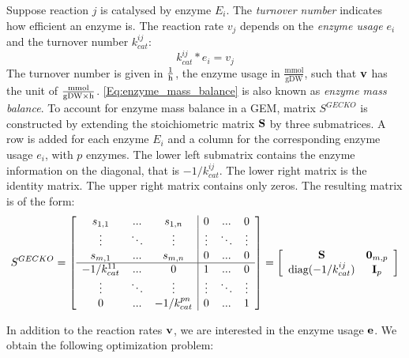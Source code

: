 Suppose reaction $j$ is catalysed by enzyme $E_i$. The \textit{turnover number} indicates how efficient an enzyme is. The reaction rate $v_j$ depends on the \textit{enzyme usage} $e_i$ and the turnover number $k_{cat}^{ij}$: 
\begin{equation} \label{Eq:enzyme_mass_balance}
    k_{cat}^{ij} * e_i = v_j   
\end{equation}
The turnover number is given in $\frac{1}{\text h}$, the enzyme usage in $\frac{\text{mmol}}{\text{gDW}}$, such that $\bold v$ has the unit of $\frac{\text{mmol}}{\text{gDW} \times \text h}$. 
\cref{Eq:enzyme_mass_balance} is also known as \textit{enzyme mass balance}.
To account for enzyme mass balance in a GEM, matrix $S^{GECKO}$ is constructed by extending the stoichiometric matrix $\bold S$ by three submatrices. 
A row is added for each enzyme $E_i$ and a column for the corresponding enzyme usage $e_i$, with $p$ enzymes. The lower left submatrix contains the enzyme information on the diagonal, that is $-1/k_{cat}^{ij}$. The lower right matrix is the identity matrix. The upper right matrix contains only zeros.
The resulting matrix is of the form:
\begin{equation*}
    S^{GECKO} = \left[\begin{array}{ccc|ccc} 
        s_{1,1} & \text{...} & s_{1,n} & 0 & \text{...} & 0 \\ 
        \vdots & \ddots & \vdots & \vdots & \ddots & \vdots \\
        s_{m,1} & \text{...} & s_{m,n} & 0 & \text{...} & 0 \\
        \hline 
        -1/k_{cat}^{11} & \text{...} & 0 & 1 & \text{...} & 0 \\ 
        \vdots & \ddots & \vdots & \vdots & \ddots & \vdots \\
        0 & \text{...} & -1/k_{cat}^{pn} & 0 & \text{...} & 1
    \end{array}\right] = 
    \left[\begin{array}{cc} 
        \bold S & \bold 0_{m,p} \\
        \text{diag} (-1/k_{cat}^{ij}) & \bold I_p
    \end{array}\right]
\end{equation*}

In addition to the reaction rates $\bold v$, we are interested in the enzyme usage $\bold e$. We obtain the following optimization problem:

